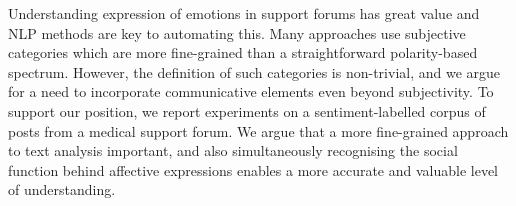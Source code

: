 Understanding expression of emotions in support forums has great value and NLP methods are key to automating this. Many approaches use subjective categories which are more fine-grained than a straightforward polarity-based spectrum. However, the definition of such categories is non-trivial, and we argue for a need to incorporate communicative elements even beyond subjectivity. To support our position, we report experiments on a sentiment-labelled corpus of posts from a medical support forum. We argue that a more fine-grained approach to text analysis important, and also simultaneously recognising the social function behind affective expressions enables a more accurate and valuable level of understanding.

